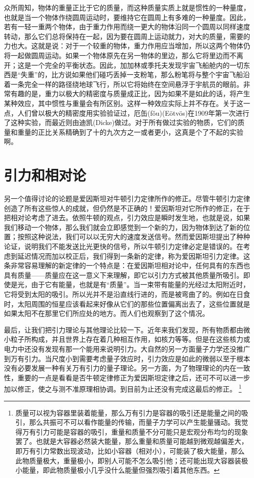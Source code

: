 \documentclass[12pt,oneside]{book}
\begin{document}
众所周知，物体的重量正比于它的质量，而这种质量实质上就是惯性的一种量度，也就是当一个物体作绕圆周运动时，要维持它在圆周上有多难的一种量度。因此，若有一轻一重两个物体，由于重力作用而绕一更大的物体沿同一个圆周以同样速度转动，那么它们总将保持在一起，因为要在圆周上运动就力，对大的质量，需要的力也大。这就是说：对于一个较重的物体，重力作用应当增加，所以这两个物体仍将一起做圆周运动。如果一个物体原先在另一物体的里边，那么它将里边而不离开；这是一个完全的平衡状态。因此，加加林或季托夫发现宇宙飞船舱内的一切东西是“失重”的，比方说如果他们碰巧丢掉一支粉笔，那么粉笔将与整个宇宙飞船沿着一条完全一样的路径绕地球飞行，所以它将始终在空间悬浮于宇航员的眼前。非常有趣的是，重力以极大的精密度与质量成正比，因为如果不是如此的话，将产生某种效应，其中惯性与重量会有所区别。这样一种效应实际上并不存在。关于这一点，人们曾以极大的精密度用实验验证过，厄缶(fǒu)(E\"otv\"os)在1909年第一次进行了这种实验，而最近则由迪凯(Dicke)做过。对于所有做过实验的物质，它们的质量和重量的正比关系精确到了十的九次方之一或者更小，这真是个了不起的实验啊。



\section{引力和相对论}
另一个值得讨论的论题是爱因斯坦对牛顿引力定律所作的修正。尽管牛顿引力定律创造了所有这些惊人的成就，但仍然是不正确的！爱因斯坦对它所作的修正，在于把相对论考虑了进去。依照牛顿的观点，引力效应是瞬时发生地，也就是说，如果我们移动一个物体，那么我们就会立即感觉到一个新的力，因为物体到达了新的位置；按照这种说法，我们可以以无穷大的速度发送信号。然而爱因斯坦提出了种种论证，说明我们不能发送比光更快的信号，所以牛顿引力定律必定是错误的。在考虑到延迟情况而加以校正后，我们得到一条新的定律，称为爱因斯坦引力定律。这条非常容易理解的新定律的一个特点是：在爱因斯坦相对论中，任何具有的东西也具有质量——质量应在这一意义下来理解，即它以引力方式被其他质量所吸引。即使是光，由于它有能量，也就是有“质量”。当一束带有能量的光经过太阳附近时，它将受到太阳的吸引。所以光并不是沿直线行进的，而是被弯曲了的。例如在日食时，太阳周围的恒星应该看起来好像从它们的那些位置偏离出去了，这些位置就是如果太阳不在那里它们所应处的地方。而人们也观察到了这个情况。

最后，让我们把引力理论与其他理论比较一下。近年来我们发现，所有物质都由微小粒子所构成，并且世界上存在着几种相互作用，如核力等等。但是在这些核力或电力中还没有发现有那一个能用来说明引力。大自然的另一方面量子力学还没推广到万有引力。当尺度小到需要考虑量子效应时，引力效应是如此的微弱以至于根本没有必要发展一种有关万有引力的量子理论。另一方面，为了物理理论的内在一致性，重要的一点是看看是否牛顿定律修正为爱因斯坦定律之后，还可不可以进一步加以修正，使之与测不准原理相协调。到目前为止还没有完成这最后的修正。
\footnote{质量可以视为容器里装着能量，那么万有引力是容器的吸引还是能量之间的吸引，那么共振可不可以看作能量的传输，而量子力学可以产生能量骚动。我觉得万有引力可能是容器的吸引，重量和质量不分可能只是宏观分布均匀的现象罢了。也就是大容器必然装大能量，那么重量和质量可能越到微观越偏差大，即万有引力常数出现波动，比如小容器（相对小），可能装了极大能量，那么此物质量极大，重量极小，即别人可能不怎么吸引他；还可能出现大容器装极小能量，即此物质量极小几乎没什么能量但强烈吸引着其他东西。}
\end{document}
